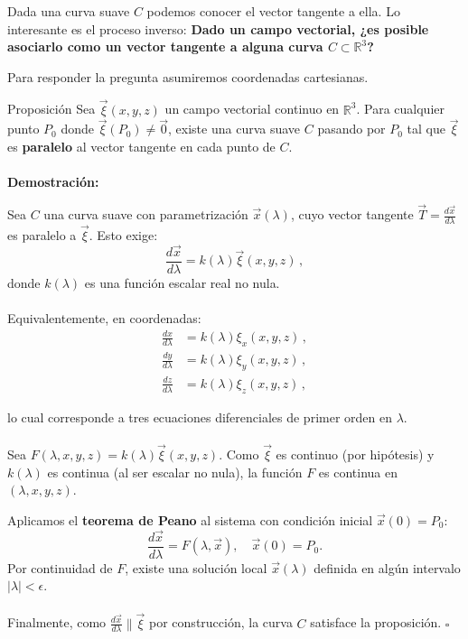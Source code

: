 \documentclass[../apunte_mecanica_clasica.tex]{subfiles}%
\begin{document}
Dada una curva suave $C$ podemos conocer el vector tangente a ella. Lo interesante es el proceso inverso: \textbf{Dado un campo vectorial, ¿es posible asociarlo como un vector tangente a alguna curva $C \subset \mathbb{R}^3$?}

Para responder la pregunta asumiremos coordenadas cartesianas.

\begin{apuntebloque}{Proposición}
Sea $\vec{\xi}(x, y, z)$ un campo vectorial continuo en $\mathbb{R}^3$. Para cualquier punto $P_0$ donde $\vec{\xi}(P_0) \neq \vec{0}$, existe una curva suave $C$ pasando por $P_0$ tal que $\vec{\xi}$ es \textbf{paralelo} al vector tangente en cada punto de $C$.
\\
\\
\textbf{Demostración:}  

Sea $C$ una curva suave con parametrización $\vec{x}(\lambda)$, cuyo vector tangente $\vec{T} = \frac {d \vec{x}}{d\lambda}$ es paralelo a $\vec{\xi}$. Esto exige:  
\begin{equation} \label{sist_coor:vector_tangente}
    \frac{d\vec{x}}{d\lambda} = k(\lambda) \vec{\xi}(x, y, z)\,,
\end{equation}  
donde $k(\lambda)$ es una función escalar real no nula.  
\\
\\
Equivalentemente, en coordenadas:  
\begin{equation}\label{sist_coor:vector_tangente_coordenadas}
\begin{aligned}
\frac{dx}{d\lambda} &= k(\lambda) \xi_x(x, y, z) \,, \\
\frac{dy}{d\lambda} &= k(\lambda) \xi_y(x, y, z) \,,\\
\frac{dz}{d\lambda} &= k(\lambda) \xi_z(x, y, z) \,,
\end{aligned}    
\end{equation}  

lo cual corresponde a tres ecuaciones diferenciales de primer orden en $\lambda$.
\\
\\
Sea $F(\lambda, x, y, z) = k(\lambda) \vec{\xi}(x,y,z)$. Como $\vec{\xi}$ es continuo (por hipótesis) y $k(\lambda)$ es continua (al ser escalar no nula), la función $F$ es continua en $(\lambda, x, y, z)$.  

Aplicamos el \textbf{teorema de Peano} al sistema con condición inicial $\vec{x}(0) = P_0$:  
\begin{equation*}
\frac{d\vec{x}}{d\lambda} = F(\lambda, \vec{x}), \quad \vec{x}(0) = P_0.
\end{equation*}
Por continuidad de $F$, existe una solución local $\vec{x}(\lambda)$ definida en algún intervalo $|\lambda| < \epsilon$.  
\\
\\
Finalmente, como $\frac{d\vec{x}}{d\lambda} \parallel \vec{\xi}$ por construcción, la curva $C$ satisface la proposición.  
\hfill $\square$

\end{apuntebloque}
\end{document}
